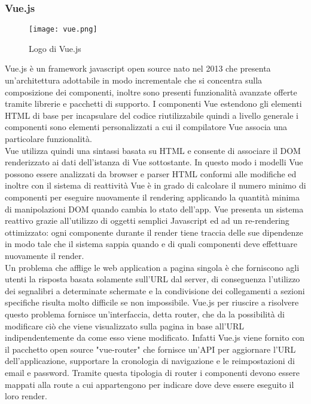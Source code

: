 \subsubsection{Vue.js}
\begin{figure}[H]
	\begin{center}
		\texttt{[image: vue.png]}
		\caption{Logo di Vue.js}
	\end{center}
\end{figure}
Vue.js è un framework javascript open source nato nel 2013 che presenta un'architettura adottabile in modo incrementale che si concentra sulla composizione dei componenti, inoltre sono presenti funzionalità avanzate offerte tramite librerie e pacchetti di supporto. I componenti Vue estendono gli elementi HTML di base per incapsulare del codice riutilizzabile quindi a livello generale i componenti sono elementi personalizzati a cui il compilatore Vue associa una particolare funzionalità.\\
Vue utilizza quindi una sintassi basata su HTML e consente di associare il DOM renderizzato ai dati dell'istanza di Vue sottostante. In questo modo i modelli Vue possono essere analizzati da browser e parser HTML conformi alle modifiche ed inoltre con il sistema di reattività Vue è in grado di calcolare il numero minimo di componenti per eseguire nuovamente il rendering applicando la quantità minima di manipolazioni DOM quando cambia lo stato dell'app. Vue presenta un sistema reattivo grazie all'utilizzo di oggetti semplici Javascript ed ad un re-rendering ottimizzato: ogni componente durante il render tiene traccia delle sue dipendenze in modo tale che il sistema sappia quando e di quali componenti deve effettuare nuovamente il render.\\
Un problema che afflige le web application a pagina singola è che forniscono agli utenti la risposta basata solamente sull'URL dal server, di conseguenza l'utilizzo dei segnalibri a determinate schermate e la condivisione dei collegamenti a sezioni specifiche risulta molto difficile se non impossibile. Vue.js per riuscire a risolvere questo problema fornisce un'interfaccia, detta router, che da la possibilità di modificare ciò che viene visualizzato sulla pagina in base all'URL indipendentemente da come esso viene modificato. Infatti Vue.js viene fornito con il pacchetto open source "vue-router" che fornisce un'API per aggiornare l'URL dell'applicazione, supportare la cronologia di navigazione e le reimpostazioni di email e password. Tramite questa tipologia di router i componenti devono essere mappati alla route a cui appartengono per indicare dove deve essere eseguito il loro render.\\
